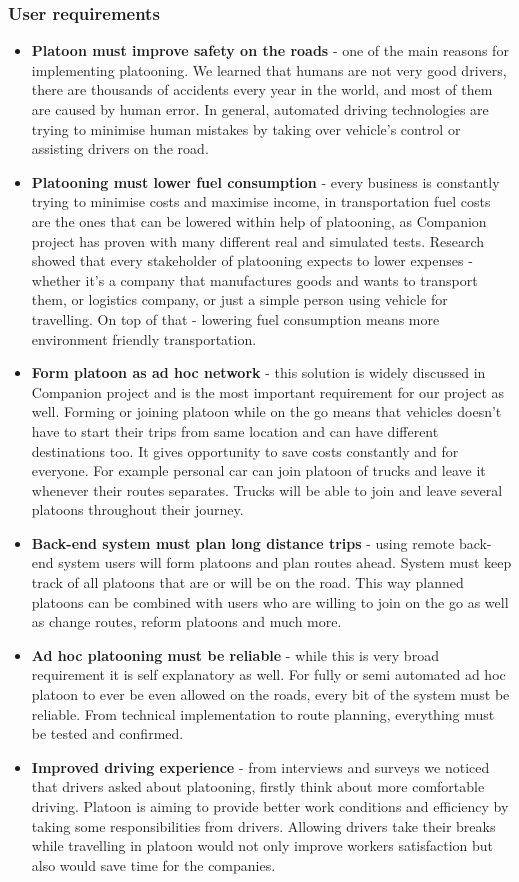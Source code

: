 \subsubsection{User requirements}
%
\begin{itemize}
    \item\textbf{Platoon must improve safety on the roads} - one of the main reasons for implementing platooning. We learned that humans are not very good drivers, there are thousands of accidents every year in the world, and most of them are caused by human error. In general, automated driving technologies are trying to minimise human mistakes by taking over vehicle's control or assisting drivers on the road.
    \item\textbf{Platooning must lower fuel consumption} - every business is constantly trying to minimise costs and maximise income, in transportation fuel costs are the ones that can be lowered within help of platooning, as Companion project has proven with many different real and simulated tests. Research showed that every stakeholder of platooning expects to lower expenses - whether it's a company that manufactures goods and wants to transport them, or logistics company, or just a simple person using vehicle for travelling. On top of that - lowering fuel consumption means more environment friendly transportation.
    \item\textbf{Form platoon as ad hoc network} - this solution is widely discussed in Companion project and is the most important requirement for our project as well. Forming or joining platoon while on the go means that vehicles doesn't have to start their trips from same location and can have different destinations too. It gives opportunity to save costs constantly and for everyone. For example personal car can join platoon of trucks and leave it whenever their routes separates. Trucks will be able to join and leave several platoons throughout their journey.
    \item\textbf{Back-end system must plan long distance trips} - using remote back-end system users will form platoons and plan routes ahead. System must keep track of all platoons that are or will be on the road. This way planned platoons can be combined with users who are willing to join on the go as well as change routes, reform platoons and much more.
    \item\textbf{Ad hoc platooning must be reliable} - while this is very broad requirement it is self explanatory as well. For fully or semi automated ad hoc platoon to ever be even allowed on the roads, every bit of the system must be reliable. From technical implementation to route planning, everything must be tested and confirmed.
    \item\textbf{Improved driving experience} - from interviews and surveys we noticed that drivers asked about platooning, firstly think about more comfortable driving. Platoon is aiming to provide better work conditions and efficiency by taking some responsibilities from drivers. Allowing drivers take their breaks while travelling in platoon would not only improve workers satisfaction but also would save time for the companies.
\end{itemize}
%
